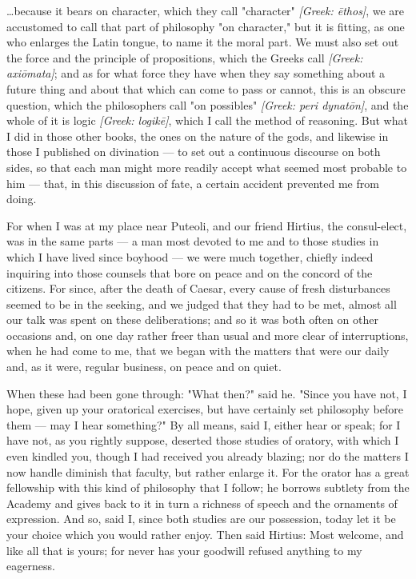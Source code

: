 
 \dots because it bears on character, which they call "character" \textit{[Greek: ēthos]}, we are accustomed to call that part of philosophy "on character," but it is fitting, as one who enlarges the Latin tongue, to name it the moral part. We must also set out the force and the principle of propositions, which the Greeks call \textit{[Greek: axiōmata]}; and as for what force they have when they say something about a future thing and about that which can come to pass or cannot, this is an obscure question, which the philosophers call "on possibles" \textit{[Greek: peri dynatōn]}, and the whole of it is logic \textit{[Greek: logikē]}, which I call the method of reasoning. But what I did in those other books, the ones on the nature of the gods, and likewise in those I published on divination — to set out a continuous discourse on both sides, so that each man might more readily accept what seemed most probable to him — that, in this discussion of fate, a certain accident prevented me from doing.

 For when I was at my place near Puteoli, and our friend Hirtius, the consul-elect, was in the same parts — a man most devoted to me and to those studies in which I have lived since boyhood — we were much together, chiefly indeed inquiring into those counsels that bore on peace and on the concord of the citizens. For since, after the death of Caesar, every cause of fresh disturbances seemed to be in the seeking, and we judged that they had to be met, almost all our talk was spent on these deliberations; and so it was both often on other occasions and, on one day rather freer than usual and more clear of interruptions, when he had come to me, that we began with the matters that were our daily and, as it were, regular business, on peace and on quiet.

 When these had been gone through: "What then?" said he. "Since you have not, I hope, given up your oratorical exercises, but have certainly set philosophy before them — may I hear something?" By all means, said I, either hear or speak; for I have not, as you rightly suppose, deserted those studies of oratory, with which I even kindled you, though I had received you already blazing; nor do the matters I now handle diminish that faculty, but rather enlarge it. For the orator has a great fellowship with this kind of philosophy that I follow; he borrows subtlety from the Academy and gives back to it in turn a richness of speech and the ornaments of expression. And so, said I, since both studies are our possession, today let it be your choice which you would rather enjoy. Then said Hirtius: Most welcome, and like all that is yours; for never has your goodwill refused anything to my eagerness.

